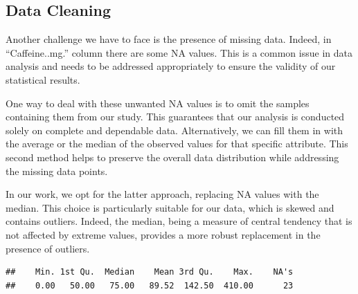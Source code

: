 \documentclass[
]{article}
\newenvironment{Shaded}{\begin{snugshade}}{\end{snugshade}}
\newcommand{\AttributeTok}[1]{\textcolor[rgb]{0.13,0.29,0.53}{#1}}
\newcommand{\CommentTok}[1]{\textcolor[rgb]{0.56,0.35,0.01}{\textit{#1}}}
\newcommand{\ConstantTok}[1]{\textcolor[rgb]{0.56,0.35,0.01}{#1}}
\newcommand{\FunctionTok}[1]{\textcolor[rgb]{0.13,0.29,0.53}{\textbf{#1}}}
\newcommand{\NormalTok}[1]{#1}
\newcommand{\OtherTok}[1]{\textcolor[rgb]{0.56,0.35,0.01}{#1}}
\newcommand{\SpecialCharTok}[1]{\textcolor[rgb]{0.81,0.36,0.00}{\textbf{#1}}}
\begin{document}
\subsection{Data Cleaning}\label{data-cleaning}

Another challenge we have to face is the presence of missing data.
Indeed, in ``Caffeine..mg.'' column there are some NA values. This is a
common issue in data analysis and needs to be addressed appropriately to
ensure the validity of our statistical results.

One way to deal with these unwanted NA values is to omit the samples
containing them from our study. This guarantees that our analysis is
conducted solely on complete and dependable data. Alternatively, we can
fill them in with the average or the median of the observed values for
that specific attribute. This second method helps to preserve the
overall data distribution while addressing the missing data points.

In our work, we opt for the latter approach, replacing NA values with
the median. This choice is particularly suitable for our data, which is
skewed and contains outliers. Indeed, the median, being a measure of
central tendency that is not affected by extreme values, provides a more
robust replacement in the presence of outliers.

\begin{Shaded}
\end{Shaded}

\begin{verbatim}
##    Min. 1st Qu.  Median    Mean 3rd Qu.    Max.    NA's 
##    0.00   50.00   75.00   89.52  142.50  410.00      23
\end{verbatim}

\begin{Shaded}
\end{Shaded}
\end{document}
